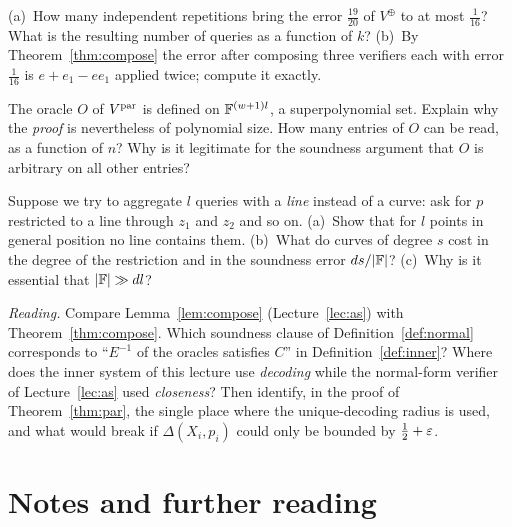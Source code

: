 \begin{exercise}[\stars{$\star\star$}]\label{ex:alm-reps}
(a)~How many independent repetitions bring the error $\tfrac{19}{20}$ of $V^\oplus$ to at most $\tfrac1{16}$?  What is the resulting number of queries as a function of $k$?  (b)~By Theorem~\ref{thm:compose} the error after composing three verifiers each with error $\tfrac1{16}$ is $e+e_1-ee_1$ applied twice; compute it exactly.
\end{exercise}

\begin{exercise}[\stars{$\star\star$}]\label{ex:oracle-size}
The oracle $O$ of $V^{\rm par}$ is defined on $\mathbb{F}^{(w+1)l}$, a superpolynomial set.  Explain why the \emph{proof} is nevertheless of polynomial size.  How many entries of $O$ can be read, as a function of $n$?  Why is it legitimate for the soundness argument that $O$ is arbitrary on all other entries?
\end{exercise}

\begin{exercise}[\stars{$\star\star$}]\label{ex:curve-line}
Suppose we try to aggregate $l$ queries with a \emph{line} instead of a curve: ask for $p$ restricted to a line through $z_1$ and $z_2$ and so on.  (a)~Show that for $l$ points in general position no line contains them.  (b)~What do curves of degree $s$ cost in the degree of the restriction and in the soundness error $d s/|\mathbb{F}|$?  (c)~Why is it essential that $|\mathbb{F}|\gg dl$?
\end{exercise}

\begin{exercise}[\stars{$\star\star\star$}]\label{ex:alm-reading}
\emph{Reading.}  Compare Lemma~\ref{lem:compose} (Lecture~\ref{lec:as}) with Theorem~\ref{thm:compose}.  Which soundness clause of Definition~\ref{def:normal} corresponds to ``$E^{-1}$ of the oracles satisfies $C$'' in Definition~\ref{def:inner}?  Where does the inner system of this lecture use \emph{decoding} while the normal-form verifier of Lecture~\ref{lec:as} used \emph{closeness}?
Then identify, in the proof of Theorem~\ref{thm:par}, the single place where the unique-decoding radius is used, and what would break if $\Delta(X_i,p_i)$ could only be bounded by $\tfrac12+\varepsilon$.
\end{exercise}


\section*{Notes and further reading}

